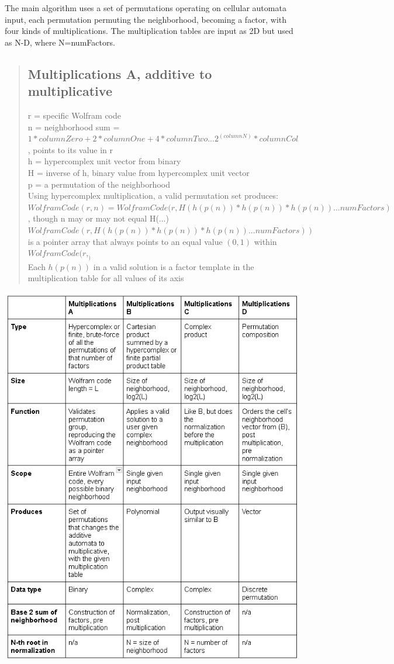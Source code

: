 \documentclass[11pt]{article}
\begin{document}
The main algorithm uses a set of permutations operating on cellular automata input, each permutation permuting the neighborhood, becoming a factor, with four kinds of multiplications. The multiplication tables are input as 2D but used as N-D, where N=numFactors.
\begin{quote}
\subsection{Multiplications A, additive to multiplicative}
r = specific Wolfram code\\
n = neighborhood sum = $1*columnZero + 2*columnOne+ 4*columnTwo...2^(columnN)*columnCol$, points to its value in r\\
h = hypercomplex unit vector from binary\\
H = inverse of h, binary value from hypercomplex unit vector\\
p = a permutation of the neighborhood\\
Using hypercomplex multiplication, a valid permutation set produces:\\
$WolframCode(r, n) = WolframCode(r,  H(h(p(n)) * h(p(n)) * h(p(n)) ... numFactors)$, though n may or may not equal H(...)\\
$WolframCode(r, H(h(p(n)) * h(p(n)) * h(p(n)) ... numFactors))$ is a pointer array that always points to an equal value $(0,1)$ within $WolframCode(r, _)$\\
Each $h(p(n))$ in a valid solution is a factor template in the multiplication table for all values of its axis\\
\end{quote}
\begin{center}
\includegraphics{MultiplicationsDiagram.jpg}
\end{center}
\end{document}
